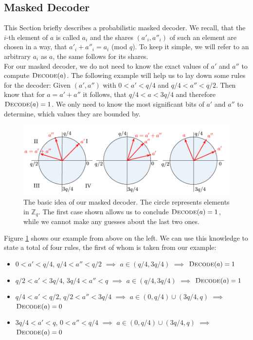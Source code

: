 \subsection{Masked Decoder}
This Section briefly describes a probabilistic masked decoder. We recall, that the \(i\)-th element of \(\textit{a}\) is called \(a_i\) and the shares \((a'_i,a''_i)\) of such an element are chosen in a way, that \(a'_i + a''_i = a_i\) (mod \(q\)). To keep it simple, we will refer to an arbitrary \(a_i\) as \(a\), the same follows for its shares.\\
For our masked decoder, we do not need to know the exact values of \(a'\) and \(a''\) to compute \(\textsc{Decode}(a)\). The following example will help us to lay down some rules for the decoder: Given \((a', a'')\) with \(0 < a' < q/4\) and \(q/4 < a'' < q/2\). Then know that for \(a=a'+a''\) it follows, that \(q/4 < a < 3q/4\) and therefore \(\textsc{Decode}(a)=1\). We only need to know the most significant bits of \(a'\) and \(a''\) to determine, which values they are bounded by.
\begin{figure}[H]
	\centering
	\includegraphics[width=\textwidth]{maskedDecoder_1.png}
	\caption{The basic idea of our masked decoder. The circle represents elements in \(\mathbb{Z}_q\). The first case shown allows us to conclude \(\textsc{Decode}(a)=1\), while we cannot make any guesses about the last two ones. \cite{maskedRing}}
	\label{maskedDecoder_1}
\end{figure}
Figure \ref{maskedDecoder_1} shows our example from above on the left. We can use this knowledge to state a total of four rules, the first of whom is taken from our example:
\begin{itemize}
\item \(0 < a' < q/4\), \(q/4 < a'' < q/2\) \(\implies\) \(a \in (q/4,3q/4)\) \(\implies\) \(\textsc{Decode}(a)=1\)
\item \(q/2 < a' < 3q/4\), \(3q/4 < a'' < q\) \(\implies\) \(a \in (q/4,3q/4)\) \(\implies\) \(\textsc{Decode}(a)=1\)
\item \(q/4 < a' < q/2\), \(q/2 < a'' < 3q/4\) \(\implies\) \(a \in (0,q/4) \cup (3q/4,q)\) \(\implies\) \(\textsc{Decode}(a)=0\)
\item \(3q/4 < a' < q\), \(0 < a'' < q/4\) \(\implies\) \(a \in (0,q/4) \cup (3q/4,q)\) \(\implies\) \(\textsc{Decode}(a)=0\)
\end{itemize}
